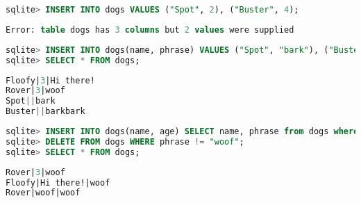 \begin{lstlisting}[language=SQL]
sqlite> INSERT INTO dogs VALUES ("Spot", 2), ("Buster", 4);
\end{lstlisting}
\begin{solution}[0.2in]
\begin{lstlisting}[language=SQL]
Error: table dogs has 3 columns but 2 values were supplied
\end{lstlisting}
\end{solution}

\begin{lstlisting}[language=SQL]
sqlite> INSERT INTO dogs(name, phrase) VALUES ("Spot", "bark"), ("Buster", "barkbark");
sqlite> SELECT * FROM dogs;
\end{lstlisting}
\begin{solution}[0.5in]
\begin{lstlisting}[language=SQL]
Floofy|3|Hi there!
Rover|3|woof
Spot||bark
Buster||barkbark
\end{lstlisting}
\end{solution}

\begin{lstlisting}[language=SQL]
sqlite> INSERT INTO dogs(name, age) SELECT name, phrase from dogs where age = 3;
sqlite> DELETE FROM dogs WHERE phrase != "woof";
sqlite> SELECT * FROM dogs;
\end{lstlisting}
\begin{solution}[0.5in]
\begin{lstlisting}[language=SQL]
Rover|3|woof
Floofy|Hi there!|woof
Rover|woof|woof
\end{lstlisting}
\end{solution}
